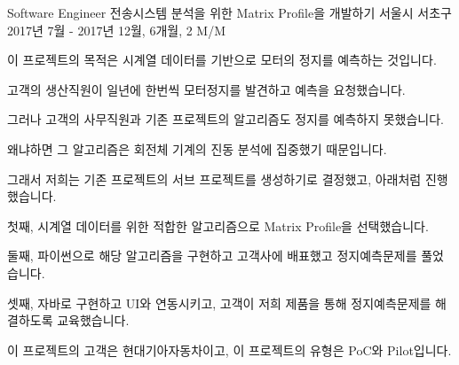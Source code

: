 \begin{cventries}
  \cventry
    {Software Engineer} %
    {전송시스템 분석을 위한 Matrix Profile을 개발하기} %
    {서울시 서초구} %
    {2017년 7월 - 2017년 12월, 6개월, 2 M/M} %
    {
      \begin{cvitems} %
        \item {이 프로젝트의 목적은 시계열 데이터를 기반으로 모터의 정지를 예측하는 것입니다.}
        \item {고객의 생산직원이 일년에 한번씩 모터정지를 발견하고 예측을 요청했습니다.}
        \item {그러나 고객의 사무직원과 기존 프로젝트의 알고리즘도 정지를 예측하지 못했습니다.}
        \item {왜냐하면 그 알고리즘은 회전체 기계의 진동 분석에 집중했기 때문입니다.}
        \item {그래서 저희는 기존 프로젝트의 서브 프로젝트를 생성하기로 결정했고, 아래처럼 진행했습니다.}
        \item {첫째, 시계열 데이터를 위한 적합한 알고리즘으로 Matrix Profile을 선택했습니다.}
        \item {둘째, 파이썬으로 해당 알고리즘을 구현하고 고객사에 배표했고 정지예측문제를 풀었습니다.}
        \item {셋째, 자바로 구현하고 UI와 연동시키고, 고객이 저희 제품을 통해 정지예측문제를 해결하도록 교육했습니다.}
        \item {이 프로젝트의 고객은 현대기아자동차이고, 이 프로젝트의 유형은 PoC와 Pilot입니다.}
      \end{cvitems}
    }


\end{cventries}
